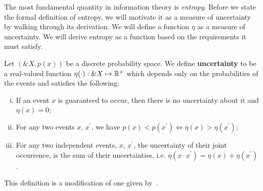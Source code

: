The most fundamental quantity in information theory is
\textit{entropy}. Before we state the formal definition of entropy, we
will motivate it as a measure of uncertainty by walking through its
derivation. We will define a function $\eta$ as a measure of
uncertainty. We will derive entropy as a function based on the
requirements it must satisfy.

\begin{definition}
  Let $(\&X, p(x))$ be a discrete probability space. We define
  \textbf{uncertainty} to be a real-valued function
  $\eta(\cdot): \&X \mapsto \mathbb{R}^+$ which depends only on the
  probabilities of the events and satisfies the following:
  \begin{enumerate}[(i)]
  \item If an event $x$ is guaranteed to occur, then there is no uncertainty
    about it and $\eta(x) = 0$;
  \item For any two events $x$, $x^\prime$, we have $p(x) < p(x^\prime) \iff
    \eta(x) > \eta(x^\prime)$;
  \item For any two independent events, $x$, $x^\prime$, the
    uncertainty of their joint occurrence, is the sum of their
    uncertainties, i.e.
    $\eta(x \cdot x^\prime) = \eta(x) + \eta(x^\prime)$.
  \end{enumerate}
\end{definition}
\begin{remark}
  This definition is a modification of one given
  by~\cite{ref:martin-2011}.
\end{remark}

